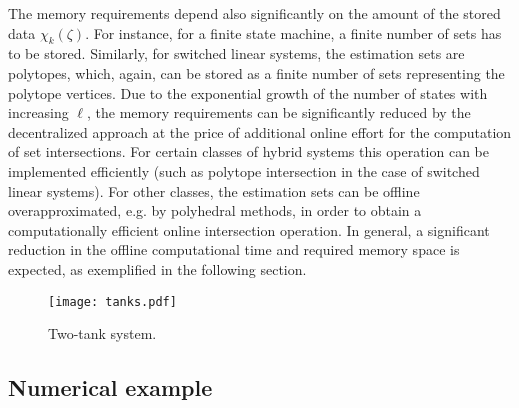 \documentclass[a4paper, 10pt, conference]{ieeeconf}
\begin{document}
The memory requirements depend also significantly on the amount of the stored data $\chi_k(\zeta)$. For instance, for a finite state machine, a finite number of sets has to be stored. Similarly, for switched linear systems, the estimation sets are polytopes, which, again, can be stored as a finite number of sets representing the polytope vertices. Due to the exponential growth of the number of states with increasing $\ell$, the memory requirements can be significantly reduced by the decentralized approach at the price of additional online effort for the computation of set intersections. For certain classes of hybrid systems this operation can be implemented efficiently (such as polytope intersection in the case of switched linear systems). For other classes, the estimation sets can be offline overapproximated, e.g. by polyhedral methods, in order to obtain a computationally efficient online intersection operation. In general, a significant reduction in the offline computational time and required memory space is expected, as exemplified in the following section. 













\begin{figure}[!h]
\vspace{-10pt}
   \centering
   \texttt{[image: tanks.pdf]}
\vspace{-10pt}
   \caption{Two-tank system.}
   \label{fig:tanks}
\vspace{-12pt}
\end{figure}


\subsection{Numerical example}
\label{sec:example}
\end{document}
